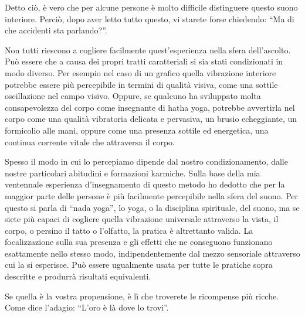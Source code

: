 Detto ciò, è vero che per alcune persone è molto difficile distinguere
questo suono interiore. Perciò, dopo aver letto tutto questo, vi starete
forse chiedendo: ``Ma di che accidenti sta parlando?''.

Non tutti riescono a cogliere facilmente quest'esperienza nella sfera
dell'ascolto. Può essere che a causa dei propri tratti caratteriali si
sia stati condizionati in modo diverso. Per esempio nel caso di un
grafico quella vibrazione interiore potrebbe essere più percepibile in
termini di qualità visiva, come una sottile oscillazione nel campo
visivo. Oppure, se qualcuno ha sviluppato molta consapevolezza del corpo
come insegnante di hatha yoga, potrebbe avvertirla nel corpo come una
qualità vibratoria delicata e pervasiva, un brusio echeggiante, un
formicolio alle mani, oppure come una presenza sottile ed energetica,
una continua corrente vitale che attraversa il corpo.

Spesso il modo in cui lo percepiamo dipende dal nostro condizionamento,
dalle nostre particolari abitudini e formazioni karmiche. Sulla base
della mia ventennale esperienza d'insegnamento di questo metodo ho
dedotto che per la maggior parte delle persone è più facilmente
percepibile nella sfera del suono. Per questo si parla di ``nada yoga'',
lo yoga, o la disciplina spirituale, del suono, ma se siete più capaci
di cogliere quella vibrazione universale attraverso la vista, il corpo,
o persino il tatto o l'olfatto, la pratica è altrettanto valida. La
focalizzazione sulla sua presenza e gli effetti che ne conseguono
funzionano esattamente nello stesso modo, indipendentemente dal mezzo
sensoriale attraverso cui la si esperisce. Può essere ugualmente usata
per tutte le pratiche sopra descritte e produrrà risultati equivalenti.

Se quella è la vostra propensione, è lì che troverete le ricompense più
ricche. Come dice l'adagio: ``L'oro è là dove lo trovi''.
